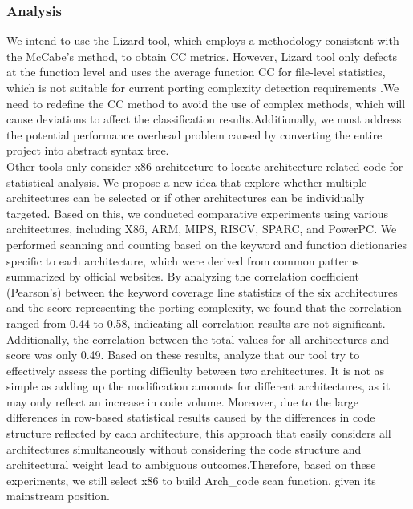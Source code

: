 \documentclass[sigconf,screen,review,anonymous]{acmart}
\begin{document}
{\subsubsection{Analysis}
We intend to use the Lizard tool, which employs a methodology consistent with the McCabe's method\cite{1702388}, to obtain CC metrics.
However, Lizard tool only defects at the function level and uses the average function CC for file-level statistics, which is not suitable for current porting complexity detection requirements \cite{9402593}.We need to redefine the CC method to avoid the use of complex methods, which will cause deviations to affect the classification results.Additionally, we must address the potential performance overhead problem caused by converting the entire project into abstract syntax tree.\\
Other tools only consider x86 architecture to locate architecture-related code for statistical analysis. We propose a new idea that explore whether multiple architectures can be selected or if other architectures can be individually targeted. Based on this, we conducted comparative experiments using various architectures, including X86, ARM, MIPS, RISCV, SPARC, and PowerPC. We performed scanning and counting based on the keyword and function dictionaries specific to each architecture, which were derived from common patterns summarized by official websites.
By analyzing the correlation coefficient (Pearson's) between the keyword coverage line statistics of the six architectures and the score representing the porting complexity, we found that the correlation ranged from 0.44 to 0.58, indicating all correlation results are not significant. Additionally, the correlation between the total values for all architectures and score was only 0.49.
Based on these results, analyze that our tool try to effectively assess the porting difficulty between two architectures. It is not as simple as adding up the modification amounts for different architectures, as it may only reflect an increase in code volume. Moreover, due to the large differences in row-based statistical results caused by the differences in code structure reflected by each architecture, this approach that easily considers all architectures simultaneously without considering the code structure and architectural weight lead to ambiguous outcomes.Therefore, based on these experiments, we still select x86 to build Arch\_code scan function, given its mainstream position.
}
\end{document}
